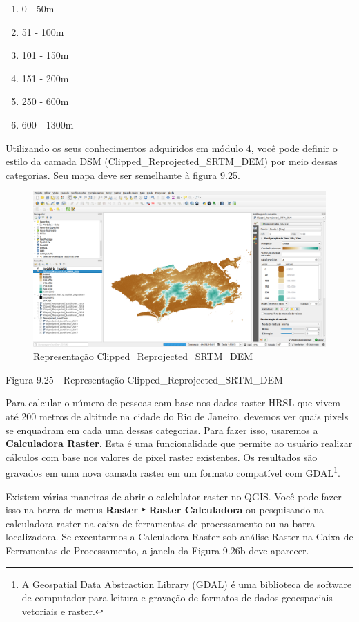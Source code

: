 \documentclass[
]{book}
\providecommand{\tightlist}{%
  \setlength{\itemsep}{0pt}\setlength{\parskip}{0pt}}
\begin{document}
\begin{enumerate}
\def\labelenumi{\arabic{enumi}.}
\tightlist
\item
  0 - 50m
\item
  51 - 100m
\item
  101 - 150m
\item
  151 - 200m
\item
  250 - 600m
\item
  600 - 1300m
\end{enumerate}

Utilizando os seus conhecimentos adquiridos em módulo 4, você pode definir o estilo da camada DSM (Clipped\_Reprojected\_SRTM\_DEM) por meio dessas categorias. Seu mapa deve ser semelhante à figura 9.25.

\begin{figure}
\centering
\includegraphics{media/modulo9/fig925.png}
\caption{Representação Clipped\_Reprojected\_SRTM\_DEM}
\end{figure}

Figura 9.25 - Representação Clipped\_Reprojected\_SRTM\_DEM

Para calcular o número de pessoas com base nos dados raster HRSL que vivem até 200 metros de altitude na cidade do Rio de Janeiro, devemos ver quais pixels se enquadram em cada uma dessas categorias. Para fazer isso, usaremos a \textbf{Calculadora Raster}. Esta é uma funcionalidade que permite ao usuário realizar cálculos com base nos valores de pixel raster existentes. Os resultados são gravados em uma nova camada raster em um formato compatível com GDAL\footnote{A Geospatial Data Abstraction Library (GDAL) é uma biblioteca de software de computador para leitura e gravação de formatos de dados geoespaciais vetoriais e raster.}.

Existem várias maneiras de abrir o calclulator raster no QGIS. Você pode fazer isso na barra de menus \textbf{Raster ‣ Raster Calculadora} ou pesquisando na calculadora raster na caixa de ferramentas de processamento ou na barra localizadora. Se executarmos a Calculadora Raster sob análise Raster na Caixa de Ferramentas de Processamento, a janela da Figura 9.26b deve aparecer.
\end{document}
